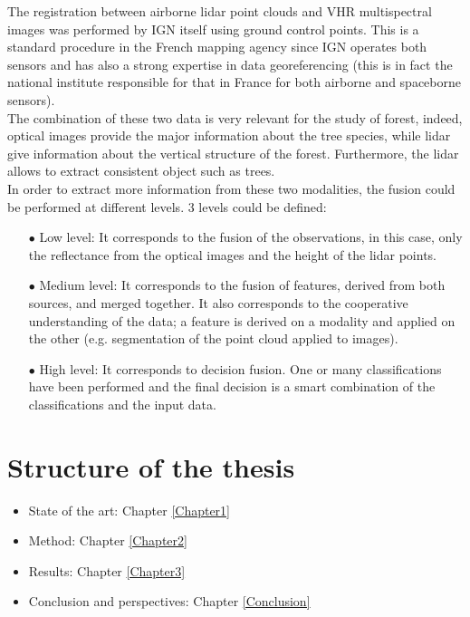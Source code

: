 The registration between airborne lidar point clouds and VHR multispectral images was performed by IGN itself using ground control points. This is a standard procedure in the French mapping agency since IGN operates both sensors and has also a strong expertise in data georeferencing (this is in fact the national institute responsible for that in France for both airborne and spaceborne sensors). \\

The combination of these two data is very relevant for the study of forest, indeed, optical images provide the major information about the tree species, while lidar give information about the vertical structure of the forest. Furthermore, the lidar allows to extract consistent object such as trees. \\

In order to extract more information from these two modalities, the fusion could be performed at different levels. 3 levels could be defined:
\begin{itemize}
\item[$\bullet$] Low level: It corresponds to the fusion of the observations, in this case, only the reflectance from the optical images and the height of the lidar points.
\item[$\bullet$] Medium level: It corresponds to the fusion of features, derived from both sources, and merged together. It also corresponds to the cooperative understanding of the data; a feature is derived on a modality and applied on the other (e.g. segmentation of the point cloud applied to images).
\item[$\bullet$] High level: It corresponds to decision fusion. One or many classifications have been performed and the final decision is a smart combination of the classifications and the input data.
\end{itemize}

\section{Structure of the thesis}

\begin{itemize}
\item State of the art: Chapter \ref{Chapter1}
\item Method: Chapter \ref{Chapter2}
\item Results: Chapter \ref{Chapter3}
\item Conclusion and perspectives: Chapter \ref{Conclusion}
\end{itemize}

\stopcontents[chapters]
